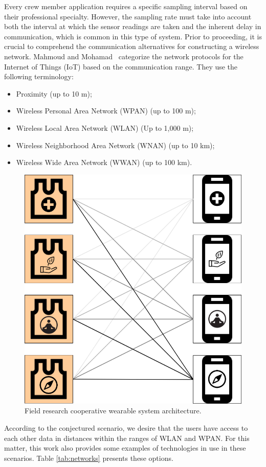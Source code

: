 Every crew member application requires a specific sampling interval based on their professional specialty. However, the sampling rate must take into account both the interval at which the sensor readings are taken and the inherent delay in communication, which is common in this type of system. Prior to proceeding, it is crucial to comprehend the communication alternatives for constructing a wireless network. Mahmoud and Mohamad~\cite{mahmoud2016study} categorize the network protocols for the Internet of Things (IoT) based on the communication range. They use the following terminology:


\begin{itemize}
    \item Proximity (up to 10 m);
    \item Wireless Personal Area Network (WPAN) (up to 100 m);
    \item Wireless Local Area Network (WLAN) (Up to 1,000 m);
    \item Wireless Neighborhood Area Network (WNAN) (up to 10 km);
    \item Wireless Wide Area Network (WWAN) (up to 100 km).
\end{itemize}\vspace{-6pt}

\begin{figure}[h!]
    \centering
    \includegraphics[width = .5\linewidth]{Figures/CFRWS.png}
    \caption{Field research cooperative wearable system architecture.}
    \label{fig:FR-CWS}
\end{figure}

According to the conjectured scenario, we desire that the users have access to each other data in distances within the ranges of WLAN and WPAN. For this matter, this work also provides some examples of technologies in use in these scenarios. Table \ref{tab:networks} presents these options.

